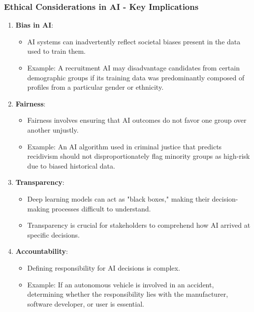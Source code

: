 \documentclass[aspectratio=169]{beamer}
\begin{document}
\begin{frame}[fragile]
    \frametitle{Ethical Considerations in AI - Key Implications}
    \begin{enumerate}
        \item \textbf{Bias in AI}: 
        \begin{itemize}
            \item AI systems can inadvertently reflect societal biases present in the data used to train them. 
            \item Example: A recruitment AI may disadvantage candidates from certain demographic groups if its training data was predominantly composed of profiles from a particular gender or ethnicity.
        \end{itemize}
        
        \item \textbf{Fairness}:
        \begin{itemize}
            \item Fairness involves ensuring that AI outcomes do not favor one group over another unjustly.
            \item Example: An AI algorithm used in criminal justice that predicts recidivism should not disproportionately flag minority groups as high-risk due to biased historical data.
        \end{itemize}
        
        \item \textbf{Transparency}:
        \begin{itemize}
            \item Deep learning models can act as "black boxes," making their decision-making processes difficult to understand.
            \item Transparency is crucial for stakeholders to comprehend how AI arrived at specific decisions.
        \end{itemize}
        
        \item \textbf{Accountability}:
        \begin{itemize}
            \item Defining responsibility for AI decisions is complex. 
            \item Example: If an autonomous vehicle is involved in an accident, determining whether the responsibility lies with the manufacturer, software developer, or user is essential.
        \end{itemize}
    \end{enumerate}
\end{frame}
\end{document}
